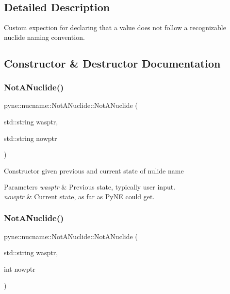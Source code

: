 \subsection{Detailed Description}
Custom expection for declaring that a value does not follow a recognizable nuclide naming convention. 

\subsection{Constructor \& Destructor Documentation}
\mbox{\label{classpyne_1_1nucname_1_1_not_a_nuclide_a32741575cb99d294d54f39bc4ca5e51c}} 
\subsubsection{\texorpdfstring{Not\+A\+Nuclide()}{NotANuclide()}\hspace{0.1cm}{\footnotesize\ttfamily [1/4]}}
{\footnotesize\ttfamily pyne\+::nucname\+::\+Not\+A\+Nuclide\+::\+Not\+A\+Nuclide (\begin{DoxyParamCaption}\item[{std\+::string}]{wasptr,  }\item[{std\+::string}]{nowptr }\end{DoxyParamCaption})\hspace{0.3cm}{\ttfamily [inline]}}

Constructor given previous and current state of nulide name 
\begin{DoxyParams}{Parameters}
{\em wasptr} & Previous state, typically user input. \\
\hline
{\em nowptr} & Current state, as far as Py\+NE could get. \\
\hline
\end{DoxyParams}
\mbox{\label{classpyne_1_1nucname_1_1_not_a_nuclide_a10f9f9c4be5b439f1dafd1450943252d}} 
\subsubsection{\texorpdfstring{Not\+A\+Nuclide()}{NotANuclide()}\hspace{0.1cm}{\footnotesize\ttfamily [2/4]}}
{\footnotesize\ttfamily pyne\+::nucname\+::\+Not\+A\+Nuclide\+::\+Not\+A\+Nuclide (\begin{DoxyParamCaption}\item[{std\+::string}]{wasptr,  }\item[{int}]{nowptr }\end{DoxyParamCaption})\hspace{0.3cm}{\ttfamily [inline]}}

